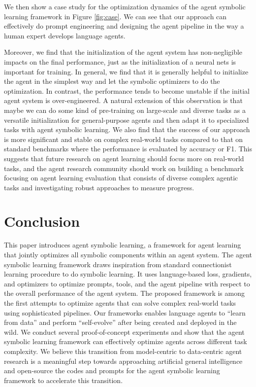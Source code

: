 \documentclass{article}
\newcommand{\baby}{agent symbolic learning\xspace}
\begin{document}
We then show a case study for the optimization dynamics of the \baby framework in Figure \ref{fig:case}. We can see that our approach can effectively do prompt engineering and designing the agent pipeline in the way a human expert develops language agents.

Moreover, we find that the initialization of the agent system has non-negligible impacts on the final performance, just as the initialization of a neural nets is important for training. In general, we find that it is generally helpful to initialize the agent in the simplest way and let the symbolic optimizers to do the optimization. In contrast, the performance tends to become unstable if the initial agent system is over-engineered. A natural extension of this observation is that maybe we can do some kind of pre-training on large-scale and diverse tasks as a versatile initialization for general-purpose agents and then adapt it to specialized tasks with \baby. We also find that the success of our approach is more significant and stable on complex real-world tasks compared to that on standard benchmarks where the performance is evaluated by accuracy or F1. This suggests that future research on agent learning should focus more on real-world tasks, and the agent research community should work on building a benchmark focusing on agent learning evaluation that consists of diverse complex agentic tasks and investigating robust approaches to measure progress.


\section{Conclusion}
This paper introduces \baby, a framework for agent learning that jointly optimizes all symbolic components within an agent system. The \baby framework draws inspiration from standard connectionist learning procedure to do symbolic learning. It uses language-based loss, gradients, and optimizers to optimize prompts, tools, and the agent pipeline with respect to the overall performance of the agent system. The proposed framework is among the first attempts to optimize agents that can solve complex real-world tasks using sophisticated pipelines. Our frameworks enables language agents to ``learn from data'' and perform ``self-evolve'' after being created and deployed in the wild. We conduct several proof-of-concept experiments and show that the \baby framework can effectively optimize agents across different task complexity. We believe this transition from model-centric to data-centric agent research is a meaningful step towards approaching artificial general intelligence and open-source the codes and prompts for the \baby framework to accelerate this transition.
\end{document}
